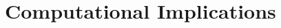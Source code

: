 \documentclass[10pt]{article}
\numberwithin{equation}{section}
\newcommand{\+}{%
	\raisebox{0.18ex}{\scaleobj{0.55}{+}}
}
\theoremstyle{definition}
\theoremstyle{definition}
\begin{document}

 
\section{Computational Implications}\label{sec:computational_imp}
\end{document}
